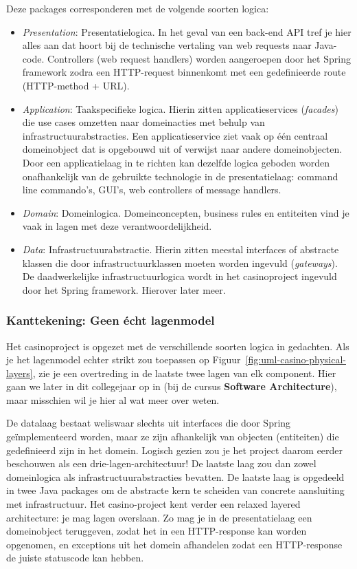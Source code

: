 Deze packages corresponderen met de volgende soorten logica:
\begin{itemize}
    \item \emph{Presentation}: Presentatielogica. In het geval van een back-end API tref
    je hier alles aan dat hoort bij de technische vertaling van web requests naar Java-code. 
    Controllers (web request handlers) worden aangeroepen door het Spring framework 
    zodra een HTTP-request binnenkomt met een gedefinieerde route (HTTP-method + URL).
    \item \emph{Application}: Taakspecifieke logica. Hierin zitten applicatieservices (\emph{facades}) 
    die use cases omzetten naar domeinacties met behulp van infrastructuurabstracties. Een applicatieservice
    ziet vaak op één centraal domeinobject dat is opgebouwd uit of verwijst naar andere domeinobjecten.
    Door een applicatielaag in te richten kan dezelfde logica geboden worden onafhankelijk van de gebruikte 
    technologie in de presentatielaag: command line commando's, GUI's, web controllers of message handlers.
    \item \emph{Domain}: Domeinlogica. Domeinconcepten, business rules en entiteiten vind je vaak in lagen 
    met deze verantwoordelijkheid.
    \item \emph{Data}: Infrastructuurabstractie. Hierin zitten meestal interfaces of abstracte klassen die door
    infrastructuurklassen moeten worden ingevuld (\emph{gateways}). De daadwerkelijke infrastructuurlogica 
    wordt in het casinoproject ingevuld door het Spring framework. Hierover later meer.
\end{itemize}

\subsubsection{Kanttekening: Geen écht lagenmodel}
Het casinoproject is opgezet met de verschillende soorten logica in gedachten. 
Als je het lagenmodel echter strikt zou toepassen op Figuur~\ref{fig:uml-casino-physical-layers}, 
zie je een overtreding in de laatste twee lagen van elk component. 
Hier gaan we later in dit collegejaar op in (bij de cursus \textbf{Software Architecture}),
maar misschien wil je hier al wat meer over weten.

De datalaag bestaat weliswaar slechts uit interfaces die door 
Spring geïmplementeerd worden, maar ze zijn afhankelijk van objecten (entiteiten) die
gedefinieerd zijn in het domein. Logisch gezien zou je het project daarom 
eerder beschouwen als een drie-lagen-architectuur! De laatste laag zou dan zowel
domeinlogica als infrastructuurabstracties bevatten. De laatste laag is opgedeeld 
in twee Java packages om de abstracte kern te scheiden van concrete 
aansluiting met infrastructuur. Het casino-project kent verder 
een relaxed layered architecture: je mag lagen overslaan.
Zo mag je in de presentatielaag een domeinobject teruggeven,
zodat het in een HTTP-response kan worden opgenomen, en exceptions uit het domein 
afhandelen zodat een HTTP-response de juiste statuscode kan hebben.

